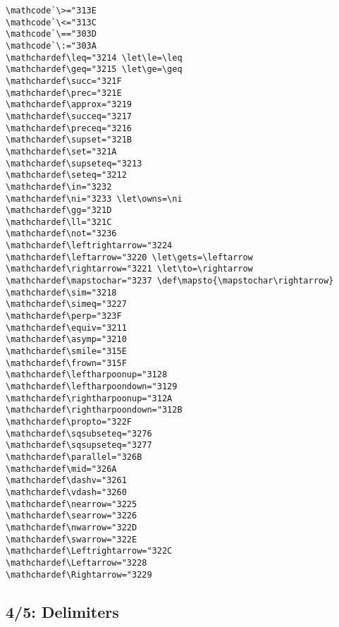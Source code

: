 {{%



%

\begin{verbatim}
\mathcode`\>="313E
\mathcode`\<="313C
\mathcode`\=="303D
\mathcode`\:="303A
\mathchardef\leq="3214 \let\le=\leq
\mathchardef\geq="3215 \let\ge=\geq
\mathchardef\succ="321F
\mathchardef\prec="321E
\mathchardef\approx="3219
\mathchardef\succeq="3217
\mathchardef\preceq="3216
\mathchardef\supset="321B
\mathchardef\set="321A
\mathchardef\supseteq="3213
\mathchardef\seteq="3212
\mathchardef\in="3232
\mathchardef\ni="3233 \let\owns=\ni
\mathchardef\gg="321D
\mathchardef\ll="321C
\mathchardef\not="3236
\mathchardef\leftrightarrow="3224
\mathchardef\leftarrow="3220 \let\gets=\leftarrow
\mathchardef\rightarrow="3221 \let\to=\rightarrow
\mathchardef\mapstochar="3237 \def\mapsto{\mapstochar\rightarrow}
\mathchardef\sim="3218
\mathchardef\simeq="3227
\mathchardef\perp="323F
\mathchardef\equiv="3211
\mathchardef\asymp="3210
\mathchardef\smile="315E
\mathchardef\frown="315F
\mathchardef\leftharpoonup="3128
\mathchardef\leftharpoondown="3129
\mathchardef\rightharpoonup="312A
\mathchardef\rightharpoondown="312B
\mathchardef\propto="322F
\mathchardef\sqsubseteq="3276
\mathchardef\sqsupseteq="3277
\mathchardef\parallel="326B
\mathchardef\mid="326A
\mathchardef\dashv="3261
\mathchardef\vdash="3260
\mathchardef\nearrow="3225
\mathchardef\searrow="3226
\mathchardef\nwarrow="322D
\mathchardef\swarrow="322E
\mathchardef\Leftrightarrow="322C
\mathchardef\Leftarrow="3228
\mathchardef\Rightarrow="3229
\end{verbatim}


\subsection{4/5: Delimiters}

}}
